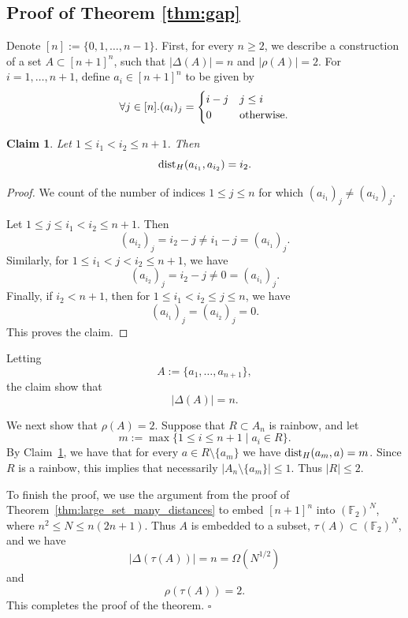 \documentclass{article}
\newtheorem{clm}[thm]{Claim}
\theoremstyle{definition}
\begin{document}
\subsection{Proof of Theorem \ref{thm:gap}}




Denote $[n]:=\{0,1,\ldots,n-1\}$. First, for every $n\ge 2$, we  describe a construction of a set 
$A\subset [n+1]^n$, such that $|\Delta(A)|=n$ and $|\rho(A)|=2$. 
For $i=1,\ldots, n+1$, define $a_i\in [n+1]^n$ to be given by 
\begin{equation}\notag
    \forall j\in [n].(a_i)_j = 
    \begin{cases} 
        i-j &  j \leq i \\ 
        0 & \text{otherwise.} 
    \end{cases}
    \label{eq:case_equation}\end{equation}

\begin{clm}\label{clm:An}
    Let $1\le i_1<i_2\le n+1$. Then 
    $$
    {\rm dist}_H(a_{i_1},a_{i_2})=i_2.
    $$
\end{clm}
\begin{proof}
We count of the number of indices $1\le j\le n$ for which $(a_{i_1})_j\neq (a_{i_2})_j$.

Let $1\le j\le i_1<i_2\le n+1$.
Then
$$
(a_{i_2})_j=i_2-j\neq i_1-j=(a_{i_1})_j.$$
Similarly, for $1\le i_1< j< i_2\le n+1$, we have
$$(a_{i_2})_j=i_2-j\neq 0=(a_{i_1})_j.$$ 
Finally, if $i_2<n+1$, then for $1\le i_1<i_2\le j\le n$, we have
$$
(a_{i_1})_j=(a_{i_2})_j=0.$$ 
This proves the claim.\end{proof}


Letting
$$
A:=\{a_1,\ldots,a_{n+1}\},
$$
the claim show that 
$$
|\Delta(A)|=n.
$$

We next show that $\rho(A)=2$.
Suppose that $R\subset A_n$ is rainbow, and let $$
m:=\max\{1\le i\le n+1\mid a_i\in R\}.$$
By Claim~\ref{clm:An}, we have that for every $a\in R\setminus \{a_m\}$ we have 
${\rm dist}_H(a_m,a)=m$.
Since $R$ is a rainbow, this implies that necessarily $|A_n\setminus\{a_m\}|\le 1$. Thus $|R|\le 2$. 

To finish the proof, we use the argument from the proof of Theorem~\ref{thm:large_set_many_distances} to embed $[n+1]^n$ into $(\mathbb{F}_2)^{N}$, where $n^2\le N\le n(2n+1)$.
Thus $A$ is embedded to a subset, $\tau(A)\subset (\mathbb{F}_2)^N$, and we have 
$$|\Delta(\tau(A))|=n=\Omega( N^{1/2})$$
and $$\rho(\tau(A))=2.$$
This completes the proof of the theorem.
\hfill$\square$
\end{document}
